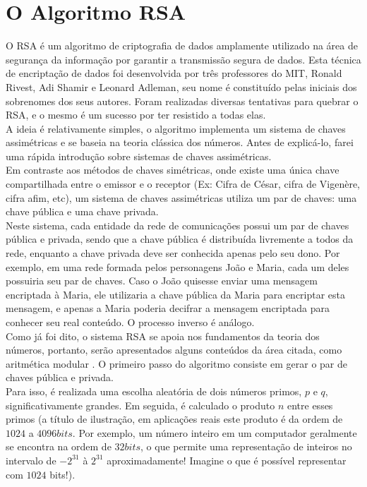 \chapter[O Algoritmo RSA]{O Algoritmo RSA}
\label{chap:rsa}
	O RSA é um algoritmo de criptografia de dados amplamente utilizado na área de segurança da informação por garantir a transmissão segura de dados. Esta técnica de encriptação de dados foi desenvolvida por três professores do MIT, Ronald Rivest, Adi Shamir e Leonard Adleman, seu nome é constituído pelas iniciais dos sobrenomes dos seus autores. Foram realizadas diversas tentativas para quebrar o RSA, e o mesmo é um sucesso por ter resistido a todas elas.
	\\ \indent A ideia é relativamente simples, o algoritmo implementa um sistema de chaves assimétricas e se baseia na teoria clássica dos números. Antes de explicá-lo, farei uma rápida introdução sobre sistemas de chaves assimétricas.
	\\ \indent Em contraste aos métodos de chaves simétricas, onde existe uma única chave compartilhada entre o emissor e o receptor (Ex: Cifra de César, cifra de Vigenère, cifra afim, etc), um sistema de chaves assimétricas utiliza um par de chaves: uma chave pública e uma chave privada.
	\\ \indent Neste sistema, cada entidade da rede de comunicações possui um par de chaves pública e privada, sendo que a chave pública é distribuída livremente a todos da rede, enquanto a chave privada deve ser conhecida apenas pelo seu dono. Por exemplo, em uma rede formada pelos personagens João e Maria, cada um deles possuiria seu par de chaves. Caso o João quisesse enviar uma mensagem encriptada à Maria, ele utilizaria a chave pública da Maria para encriptar esta mensagem, e apenas a Maria poderia decifrar a mensagem encriptada para conhecer seu real conteúdo. O processo inverso é análogo.
	\\ \indent Como já foi dito, o sistema RSA se apoia nos fundamentos da teoria dos números, portanto, serão apresentados alguns conteúdos da área citada, como aritmética modular \cite{shokranian}. O primeiro passo do algoritmo consiste em gerar o par de chaves pública e privada.
	\\ \indent Para isso, é realizada uma escolha aleatória de dois números primos, $p$ e $q$, significativamente grandes. Em seguida, é calculado o produto $n$ entre esses primos (a título de ilustração, em aplicações reais este produto é da ordem de $1024$ a $4096 bits$. Por exemplo, um número inteiro em um computador geralmente se encontra na ordem de $32 bits$, o que permite uma representação de inteiros no intervalo de $-2^{31}$ à $2^{31}$ aproximadamente! Imagine o que é possível representar com $1024$ bits!).
